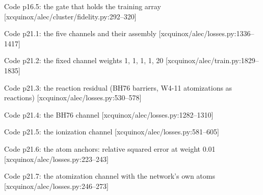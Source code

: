 \begin{frame}[allowframebreaks]{Code p16.5: the gate that holds the training array [xcquinox/alec/cluster/fidelity.py:292--320]}
\label{code:p16_5_the_gate_that_holds_the_training_array}
\end{frame}
\begin{frame}[allowframebreaks]{Code p21.1: the five channels and their assembly [xcquinox/alec/losses.py:1336--1417]}
\label{code:p21_1_the_five_channels_and_their_assembly}
\end{frame}
\begin{frame}[allowframebreaks]{Code p21.2: the fixed channel weights 1, 1, 1, 1, 20 [xcquinox/alec/train.py:1829--1835]}
\label{code:p21_2_the_fixed_channel_weights_1_1_1_1_20}
\end{frame}
\begin{frame}[allowframebreaks]{Code p21.3: the reaction residual (BH76 barriers, W4-11 atomizations as reactions) [xcquinox/alec/losses.py:530--578]}
\label{code:p21_3_the_reaction_residual_bh76_barriers_w4_1}
\end{frame}
\begin{frame}[allowframebreaks]{Code p21.4: the BH76 channel [xcquinox/alec/losses.py:1282--1310]}
\label{code:p21_4_the_bh76_channel}
\end{frame}
\begin{frame}[allowframebreaks]{Code p21.5: the ionization channel [xcquinox/alec/losses.py:581--605]}
\label{code:p21_5_the_ionization_channel}
\end{frame}
\begin{frame}[allowframebreaks]{Code p21.6: the atom anchors: relative squared error at weight 0.01 [xcquinox/alec/losses.py:223--243]}
\label{code:p21_6_the_atom_anchors_relative_squared_error}
\end{frame}
\begin{frame}[allowframebreaks]{Code p21.7: the atomization channel with the network's own atoms [xcquinox/alec/losses.py:246--273]}
\label{code:p21_7_the_atomization_channel_with_the_network}
\end{frame}
